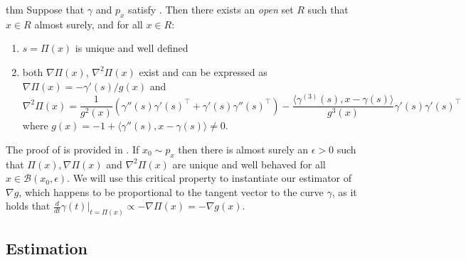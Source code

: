 \documentclass[11pt]{article}
\begin{document}
\begin{restatable}[Differentiability of $\Pi$]{thm}{} \label{thm: differentiability of pi}
    Suppose that $\gamma$ and $p_{x}$ satisfy . Then there exists an \textit{open} set $R$ such that $x \in R$ almost surely, and for all $x \in R$:
    \begin{enumerate}
        \item $s = \Pi(x)$ is unique and well defined
        \item both $\nabla\Pi(x)$, $\nabla^2\Pi(x)$ exist and can be expressed as $\nabla\Pi(x)  = -\gamma'(s)/g(x)$ and 
        \begin{equation}
            \nabla^2\Pi(x) = \frac{1}{g^2(x)}\left(\gamma''(s)\gamma'(s)^{\top} + \gamma'(s)\gamma''(s)^{\top}\right)- \frac{\langle\gamma^{(3)}(s), x - \gamma(s)\rangle}{g^3(x)}\gamma'(s)\gamma'(s)^{\top}
        \end{equation}
        where $g(x) = -1 + \langle\gamma''(s), x-\gamma(s)\rangle \neq 0$. 
    \end{enumerate}
\end{restatable}

The proof of  is provided in . If $x_0 \sim p_x$ then there is almost surely an $\epsilon >0$ such that $\Pi(x), \nabla\Pi(x)$ and $\nabla^2\Pi(x)$ are unique and well behaved for all $x \in \mathcal{B}(x_0, \epsilon).$ We will use this critical property to instantiate our estimator of $\nabla g$, which happens to be proportional to the tangent vector to the curve $\gamma$, as it holds that $\frac{d}{dt}\gamma(t)\Big|_{t = \Pi(x)} \propto -\nabla\Pi(x) = -\nabla g(x)$.

\subsection{Estimation}
\end{document}
